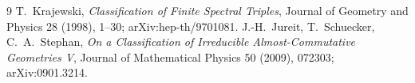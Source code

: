 \begin{thebibliography}{9}
T.~Krajewski,
\emph{Classification of Finite Spectral Triples},
Journal of Geometry and Physics 28 (1998), 1--30;
arXiv:hep-th/9701081.
J.-H.~Jureit, T.~Schuecker, C.~A.~Stephan,
\emph{On a Classification of Irreducible Almost-Commutative Geometries V},
Journal of Mathematical Physics 50 (2009), 072303; arXiv:0901.3214.
\end{thebibliography}